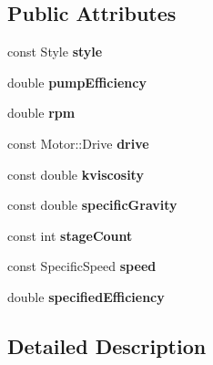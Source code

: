 \subsection*{Public Attributes}
\begin{DoxyCompactItemize}
\item 
\mbox{\label{struct_pump_1_1_input_aca184aaaa02b4e497dccec206f96a0d0}} 
const Style {\bfseries style}
\item 
\mbox{\label{struct_pump_1_1_input_a4cd450cb5c292c7d41c9b658623d46fc}} 
double {\bfseries pump\+Efficiency}
\item 
\mbox{\label{struct_pump_1_1_input_a8e5564441830cbff993ac493d3869f47}} 
double {\bfseries rpm}
\item 
\mbox{\label{struct_pump_1_1_input_ad14338611cfbf4fc0a0100d668c16f32}} 
const Motor\+::\+Drive {\bfseries drive}
\item 
\mbox{\label{struct_pump_1_1_input_a7a1be3b4723aa2f49e5fdcbcc274d0c9}} 
const double {\bfseries kviscosity}
\item 
\mbox{\label{struct_pump_1_1_input_a1608eb0dfdd429df17ea7eddc55ccad7}} 
const double {\bfseries specific\+Gravity}
\item 
\mbox{\label{struct_pump_1_1_input_a0bb32e194fea939f8ef8cc74f6dccc4b}} 
const int {\bfseries stage\+Count}
\item 
\mbox{\label{struct_pump_1_1_input_a897d65dbfaddfd286aac0dd0dd88fcb6}} 
const Specific\+Speed {\bfseries speed}
\item 
\mbox{\label{struct_pump_1_1_input_a9348df873b61fda72177cc26a4721a79}} 
double {\bfseries specified\+Efficiency}
\end{DoxyCompactItemize}


\subsection{Detailed Description}


